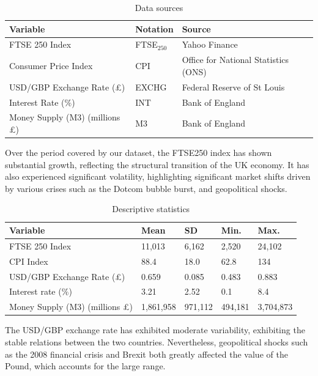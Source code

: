 \documentclass[11pt,a4paper]{article}
\begin{document}
\begin{table}[h!]
    \centering
    \caption{Data sources}
    \begin{tabular}{lll}
        \toprule
        \textbf{Variable} & \textbf{Notation} & \textbf{Source} \\
        \midrule
        FTSE 250 Index & FTSE$_{250}$ & Yahoo Finance \\
        Consumer Price Index & CPI & Office for National Statistics (ONS) \\
        USD/GBP Exchange Rate (£) & EXCHG & Federal Reserve of St Louis \\
        Interest Rate ($\%$) & INT & Bank of England \\
        Money Supply (M3) (millions £) & M3 & Bank of England \\
        \bottomrule
    \end{tabular}
\end{table}

Over the period covered by our dataset, the FTSE250 index has 
shown substantial growth, reflecting the structural transition of the UK economy.
It has also experienced significant volatility, highlighting significant market shifts driven by 
various crises such as the Dotcom bubble burst, and geopolitical shocks.

\begin{table}[h!]
    \centering
    \caption{Descriptive statistics}
    \begin{tabular}{lllll}
        \toprule
        \textbf{Variable} & \textbf{Mean} & \textbf{SD} &  \textbf{Min.} & \textbf{Max.}\\
        \midrule
        FTSE 250 Index &  11,013 & 6,162 & 2,520 & 24,102 \\
        CPI Index &  88.4 & 18.0 & 62.8 & 134 \\
        USD/GBP Exchange Rate (£) &  0.659 & 0.085 & 0.483 & 0.883 \\
        Interest rate ($\%$) &  3.21 & 2.52 & 0.1 & 8.4 \\
        Money Supply (M3) (millions £) &  1,861,958 & 971,112 & 494,181 & 3,704,873 \\
        \bottomrule
    \end{tabular}
\end{table}


The USD/GBP exchange rate has exhibited moderate variability, exhibiting the stable relations between 
the two countries. Nevertheless, geopolitical shocks such as the 2008 financial crisis and Brexit both greatly affected the value of the Pound, 
which accounts for the large range. 
\end{document}
